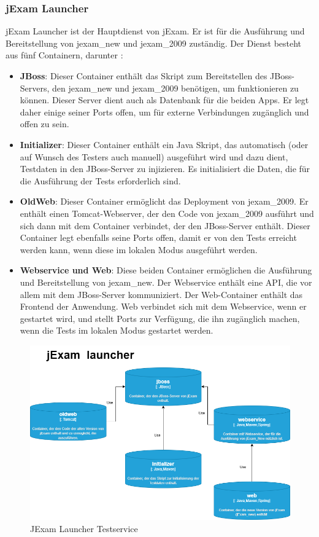 \subsubsection{jExam Launcher}

jExam Launcher ist der Hauptdienst von jExam. Er ist für die Ausführung
und Bereitstellung von \Gls{jexam_new} und \Gls{jexam_2009} zuständig. Der Dienst
besteht aus fünf Containern, darunter :

\begin{itemize}
    \setlength\itemsep{1em}

    \item[] \textbf{JBoss}: Dieser Container enthält das Skript zum
    Bereitstellen des JBoss-Servers, den \Gls{jexam_new} und \Gls{jexam_2009}
    benötigen, um funktionieren zu können. Dieser Server dient auch
    als Datenbank für die beiden Apps. Er legt daher einige seiner
    Ports offen, um für externe Verbindungen zugänglich und offen
    zu sein.

    \item[] \textbf{Initializer}: Dieser Container enthält ein
    Java Skript, das automatisch (oder auf Wunsch des Testers auch
    manuell) ausgeführt wird und dazu dient, Testdaten in den 
    JBoss-Server zu injizieren. Es initialisiert die Daten, die für
    die Ausführung der Tests erforderlich sind.

    \item[] \textbf{OldWeb}: Dieser Container ermöglicht das
    Deployment von \Gls{jexam_2009}. Er enthält einen Tomcat-Webserver,
    der den Code von \Gls{jexam_2009} ausführt und sich dann mit
    dem Container verbindet, der den JBoss-Server enthält.
    Dieser Container legt ebenfalls seine Ports offen, damit er
    von den Tests erreicht werden kann, wenn diese im lokalen 
    Modus ausgeführt werden.

    \item[] \textbf{Webservice und Web}: Diese beiden Container
    ermöglichen die Ausführung und Bereitstellung von
    \Gls{jexam_new}. Der Webservice enthält eine API, die vor
    allem mit dem JBoss-Server kommuniziert. Der Web-Container
    enthält das Frontend der Anwendung. Web verbindet sich mit
    dem Webservice, wenn er gestartet wird, und stellt Ports zur
    Verfügung, die ihn zugänglich machen, wenn die Tests im
    lokalen Modus gestartet werden.
\end{itemize}

\begin{figure}[H]
    \centering
    \includegraphics[scale=0.6]{images/launcher.drawio}
    \caption{JExam Launcher Testservice} \label{fig:laucher}
\end{figure}